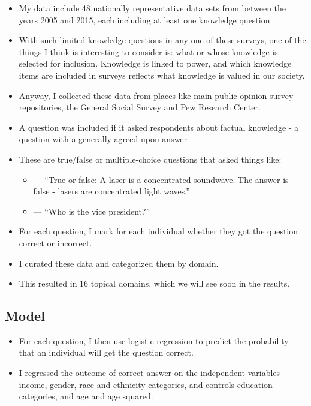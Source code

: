 \documentclass[]{article}
\begin{document}
\vspace{5mm}

\begin{itemize}
  \item{My data include 48 nationally representative data sets from between the years 2005 and 2015, each including at least one knowledge question.}
  \item{With such limited knowledge questions in any one of these surveys, one of the things I think is interesting to consider is: what or whose knowledge is selected for inclusion. Knowledge is linked to power, and which knowledge items are included in surveys reflects what knowledge is valued in our society.}
  \item{Anyway, I collected these data from places like main public opinion survey repositories, the General Social Survey and Pew Research Center.}
  \item{A question was included if it asked respondents about factual knowledge  - a question with a generally agreed-upon answer}
  \item{These are true/false or multiple-choice questions that asked things like:}
    \begin{itemize}
      \item{--- ``True or false: A laser is a concentrated soundwave. The answer is false - lasers are concentrated light waves.''}
      \item{--- ``Who is the vice president?''}
    \end{itemize}
\end{itemize}

\begin{itemize}
  \item{For each question, I mark for each individual whether they got the question correct or incorrect.}
  \item{I curated these data and categorized them by domain.}
  \item{This resulted in 16 topical domains, which we will see soon in the results.}
\end{itemize}

\subsection{Model}
\begin{itemize}
  \item{For each question, I then use logistic regression to predict the probability that an individual will get the question correct.}
  \item{I regressed the outcome of correct answer on the independent variables income, gender, race and ethnicity categories, and controls education categories, and age and age squared.}
\end{itemize}
\end{document}
